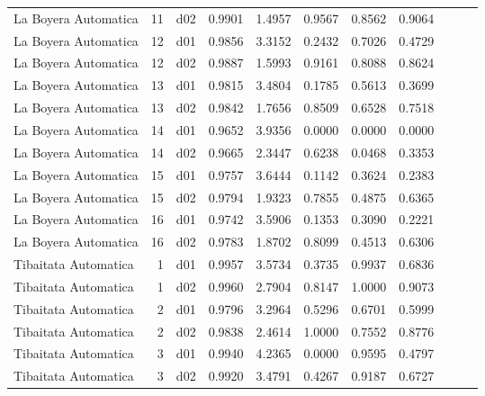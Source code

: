 \begin{landscape}
\begin{longtable}{p{2cm}rrrrrrrrrr}
 La Boyera Automatica  &         11 &     d02 &   0.9901 &  1.4957 &        0.9567 &           0.8562 &  0.9064 \\
 La Boyera Automatica  &         12 &     d01 &   0.9856 &  3.3152 &        0.2432 &           0.7026 &  0.4729 \\
 La Boyera Automatica  &         12 &     d02 &   0.9887 &  1.5993 &        0.9161 &           0.8088 &  0.8624 \\
 La Boyera Automatica  &         13 &     d01 &   0.9815 &  3.4804 &        0.1785 &           0.5613 &  0.3699 \\
 La Boyera Automatica  &         13 &     d02 &   0.9842 &  1.7656 &        0.8509 &           0.6528 &  0.7518 \\
 La Boyera Automatica  &         14 &     d01 &   0.9652 &  3.9356 &        0.0000 &           0.0000 &  0.0000 \\
 La Boyera Automatica  &         14 &     d02 &   0.9665 &  2.3447 &        0.6238 &           0.0468 &  0.3353 \\
 La Boyera Automatica  &         15 &     d01 &   0.9757 &  3.6444 &        0.1142 &           0.3624 &  0.2383 \\
 La Boyera Automatica  &         15 &     d02 &   0.9794 &  1.9323 &        0.7855 &           0.4875 &  0.6365 \\
 La Boyera Automatica  &         16 &     d01 &   0.9742 &  3.5906 &        0.1353 &           0.3090 &  0.2221 \\
 La Boyera Automatica  &         16 &     d02 &   0.9783 &  1.8702 &        0.8099 &           0.4513 &  0.6306 \\
 Tibaitata Automatica  &          1 &     d01 &   0.9957 &  3.5734 &        0.3735 &           0.9937 &  0.6836 \\
 Tibaitata Automatica  &          1 &     d02 &   0.9960 &  2.7904 &        0.8147 &           1.0000 &  0.9073 \\
 Tibaitata Automatica  &          2 &     d01 &   0.9796 &  3.2964 &        0.5296 &           0.6701 &  0.5999 \\
 Tibaitata Automatica  &          2 &     d02 &   0.9838 &  2.4614 &        1.0000 &           0.7552 &  0.8776 \\
 Tibaitata Automatica  &          3 &     d01 &   0.9940 &  4.2365 &        0.0000 &           0.9595 &  0.4797 \\
 Tibaitata Automatica  &          3 &     d02 &   0.9920 &  3.4791 &        0.4267 &           0.9187 &  0.6727 \\

\end{longtable}
\end{landscape}
